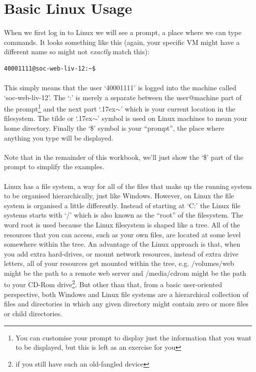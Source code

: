 \documentclass[12pt, a4paper, oneside]{book}
\begin{document}
\section{Basic Linux Usage}
\label{linux}

\paragraph{} When we first log in to Linux we will see a prompt, a place where we can type commands. It looks something like this (again, your specific VM might have a different name so might not \emph{exactly} match this):

\begin{lstlisting}[style=DOS]
    40001111@soc-web-liv-12:~$ 
\end{lstlisting}

\paragraph{} This simply means that the user `40001111' is logged into the machine called `soc-web-liv-12'. The `:' is merely a separate between the user@machine part of the prompt\footnote{You can customise your prompt to display just the information that you want to be displayed, but this is left as an exercise for you} and the next part `{\raise.17ex\hbox{$\scriptstyle\sim$}}' which is your current location in the filesystem. The tilde or `{\raise.17ex\hbox{$\scriptstyle\sim$}}' symbol is used on Linux machines to mean your home directory. Finally the `\$' symbol is your ``prompt'', the place where anything you type will be displayed.

\paragraph{} Note that in the remainder of this workbook, we'll just show the `\$' part of the prompt to simplify the examples.

\paragraph{} Linux has a file system, a way for all of the files that make up the running system to be organised hierarchically, just like Windows. However, on Linux the file system is organised a little differently. Instead of starting at `C:' the Linux file systems starts with `/' which is also known as the ``root'' of the filesystem. The word root is used because the Linux filesystem is shaped like a tree. All of the resources that you can access, such as your own files, are located at some level somewhere within the tree. An advantage of the Linux approach is that, when you add extra hard-drives, or mount network resources, instead of extra drive letters, all of your resources get mounted within the tree, e.g. /volumes/web might be the path to a remote web server and /media/cdrom might be the path to your CD-Rom drive\footnote{if you still have such an old-fangled device}. But other than that, from a basic user-oriented perspective, both Windows and Linux file systems are a hierarchical collection of files and directories in which any given directory might contain zero or more files or child directories.
\end{document}
